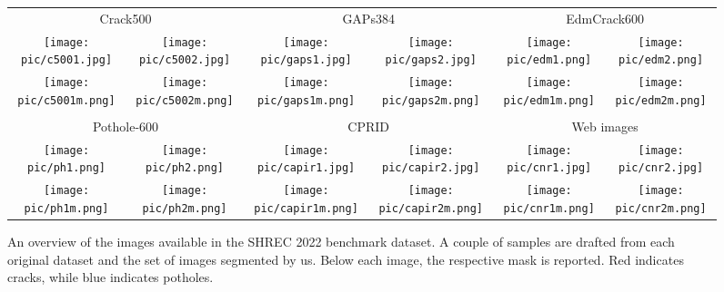 \documentclass[twocolumn]{article}
\begin{document}
\begin{figure*}[t]
    \centering
    \setlength{\tabcolsep}{0pt}
    \newcommand{\datasetimageswidth}{.165}
    \begin{tabular}{||cccccc||}
        \hline \hline
        \multicolumn{2}{||c}{Crack500} &
        \multicolumn{2}{c}{GAPs384} &
        \multicolumn{2}{c||}{EdmCrack600} \\
        \texttt{[image: pic/c5001.jpg]} &
        \texttt{[image: pic/c5002.jpg]} &
        \texttt{[image: pic/gaps1.jpg]} &
        \texttt{[image: pic/gaps2.jpg]} &
        \texttt{[image: pic/edm1.png]} &
        \texttt{[image: pic/edm2.png]} \\
        \texttt{[image: pic/c5001m.png]} &
        \texttt{[image: pic/c5002m.png]} &
        \texttt{[image: pic/gaps1m.png]} &
        \texttt{[image: pic/gaps2m.png]} &
        \texttt{[image: pic/edm1m.png]} &
        \texttt{[image: pic/edm2m.png]} \\ &&&&& \\
        \multicolumn{2}{||c}{Pothole-600} &
        \multicolumn{2}{c}{CPRID} &
        \multicolumn{2}{c||}{Web images} \\
        \texttt{[image: pic/ph1.png]} &
        \texttt{[image: pic/ph2.png]} &
        \texttt{[image: pic/capir1.jpg]} &
        \texttt{[image: pic/capir2.jpg]} &
        \texttt{[image: pic/cnr1.jpg]} & \texttt{[image: pic/cnr2.jpg]} \\
        \texttt{[image: pic/ph1m.png]} & \texttt{[image: pic/ph2m.png]} &
        \texttt{[image: pic/capir1m.png]} &
        \texttt{[image: pic/capir2m.png]} &
        \texttt{[image: pic/cnr1m.png]} & \texttt{[image: pic/cnr2m.png]} \\ \hline \hline
    \end{tabular}
    \caption{An overview of the images available in the SHREC 2022 benchmark dataset. A couple of samples are drafted from each original dataset and the set of images segmented by us. Below each image, the respective mask is reported. Red indicates cracks, while blue indicates potholes.}
    \label{fig:ds_im_examples}
\end{figure*}
\end{document}
